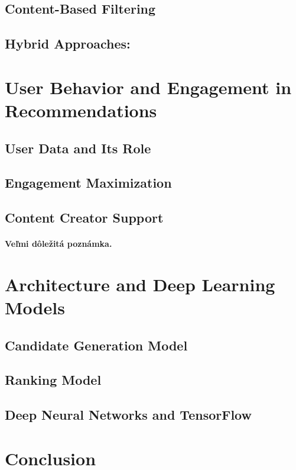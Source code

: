 \documentclass[12pt,english,a4paper]{article}
\begin{document}
\subsection{Content-Based Filtering} \label{core:cont-based}
\subsection{Hybrid Approaches:} \label{core:hybrid}

\section{User Behavior and Engagement in Recommendations} \label{behavior}
\subsection{User Data and Its Role} \label{behavior:userdata}
\subsection{Engagement Maximization} \label{behavior:engagement}
\subsection{Content Creator Support} \label{behavior:ccsuport}
\paragraph{Veľmi dôležitá poznámka.}
\section{Architecture and Deep Learning Models} \label{arch}
\subsection{Candidate Generation Model} \label{arch:cangen}
\subsection{Ranking Model} \label{arch:rank}
\subsection{Deep Neural Networks and TensorFlow} \label{arch:dnnt}
\section{Conclusion} \label{concl}

\printbibliography
\end{document}
